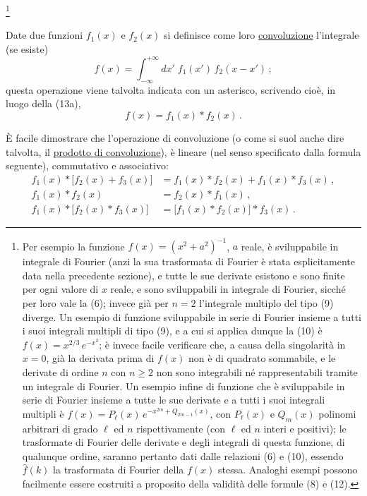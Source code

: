 \documentclass[11pt, a4paper]{book}
\numberwithin{equation}{section}
\begin{document}
\footnote{Per esempio la funzione $f(x) = (x^2+a^2)^{-1}$, $a$ reale, è sviluppabile in integrale di Fourier (anzi la sua trasformata di Fourier è stata esplicitamente data nella precedente sezione), e tutte le sue derivate esistono e sono finite per ogni valore di $x$ reale, e sono sviluppabili in integrale di Fourier, sicché per loro vale la (6); invece già per $n=2$ l'integrale multiplo del tipo (9) diverge. Un esempio di funzione sviluppabile in serie di Fourier insieme a tutti i suoi integrali multipli di tipo (9), e a cui si applica dunque la (10) è $f(x) = x^{2/3}\,e^{-x^2}$; è invece facile verificare che, a causa della singolarità in $x=0$, già la derivata prima di $f(x)$ non è di quadrato sommabile, e le derivate di ordine $n$ con $n\geq2$ non sono integrabili né rappresentabili tramite un integrale di Fourier. Un esempio infine di funzione che è sviluppabile in serie di Fourier insieme a tutte le sue derivate e a tutti i suoi integrali multipli è $f(x) = P_\ell(x)\,e^{-x^{2m}+Q_{2m-1}(x)}$, con $P_\ell(x)$ e $Q_m(x)$ polinomi arbitrari di grado $\ell$ ed $n$ rispettivamente (con $\ell$ ed $n$ interi e positivi); le trasformate di Fourier delle derivate e degli integrali di questa funzione, di qualunque ordine, saranno pertanto dati dalle relazioni (6) e (10), essendo $\hat{f}(k)$ la trasformata di Fourier della $f(x)$ stessa. Analoghi esempi possono facilmente essere costruiti a proposito della validità delle formule (8) e (12).}

Date due funzioni $f_1(x)$ e $f_2(x)$ si definisce come loro \underline{convoluzione} l'integrale (se esiste)
\begin{equation}
  f(x) = \int_{-\infty}^{+\infty} dx'\;f_1(x')\,f_2(x-x')\,; \tag{13a}
\end{equation}
questa operazione viene talvolta indicata con un asterisco, scrivendo cioè, in luogo della (13a),
\begin{equation}
  f(x) = f_1(x) * f_2(x)\,. \tag{13b}
\end{equation}

È facile dimostrare che l'operazione di convoluzione (o come si suol anche dire talvolta, il \underline{prodotto di convoluzione}), è lineare (nel senso specificato dalla formula seguente), commutativo e associativo:
\begin{align}
  f_1(x)*\bigl[f_2(x)+f_3(x)\bigr] &= f_1(x)*f_2(x)+f_1(x)*f_3(x)\,, \tag{14}\\
  f_1(x)*f_2(x) &= f_2(x)*f_1(x)\,, \tag{15}\\
  f_1(x)*\bigl[f_2(x)*f_3(x)\bigr] &= \bigl[f_1(x)*f_2(x)\bigr]*f_3(x)\,. \tag{16}
\end{align}
\end{document}
